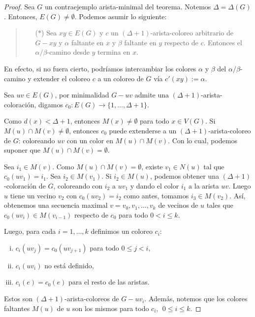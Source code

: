 \documentclass[12pt]{report}
\theoremstyle{plain}
\theoremstyle{definition}
\begin{document}
\begin{proof}
Sea $G$ un contraejemplo arista-minimal del teorema. Notemos $\Delta = \Delta (G)$. Entonces, $E(G) \neq \emptyset$. Podemos asumir lo siguiente:

\begin{quote}
\begin{enumerate}
\item[({$\ast$})]\label{vizing-proof-condition} Sea $xy \in E(G)$ y $c$ un $(\Delta + 1)$-arista-coloreo arbitrario de $G - xy$ y $\alpha$ faltante en $x$ y $\beta$ faltante en $y$ respecto de $c$. Entonces el $\alpha/\beta$-camino desde $y$ termina en $x$.
\end{enumerate}
\end{quote}
En efecto, si no fuera cierto, podríamos intercambiar los colores $\alpha$ y $\beta$ del $\alpha/\beta$-camino y extender el coloreo $c$ a un coloreo de $G$ vía $c'(xy):= \alpha$.

Sea $uv \in E(G)$, por minimalidad $G -uv$ admite una $(\Delta +1)$-arista-coloración, digamos $c_0: E(G) \rightarrow \{1, \ldots, \Delta + 1\}$.

\Inkscape{}

Como $d(x) < \Delta + 1$, entonces $M(x) \neq \emptyset$ para todo $x \in V(G)$. Si $M(u) \cap M(v) \neq \emptyset$, entonces $c_0$ puede extenderse a un $(\Delta + 1)$-arista-coloreo de $G$: coloreando $uv$ con un color en $M(u) \cap M(v)$. Con lo cual, podemos suponer que $M(u) \cap M(v) = \emptyset$.

Sea $i_1 \in M(v)$. Como $M(u) \cap M(v)  = \emptyset$, existe $v_1 \in N(u)$ tal que $c_0(uv_1) = i_1$. Sea $i_2 \in M(v_1)$. Si $i_2 \in M(u)$, podemos obtener una $(\Delta+1)$-coloración de $G$, coloreando con $i_2$ a $uv_1$ y dando el color $i_1$ a la arista $uv$. Luego $u$ tiene un vecino $v_2$ con $c_0(uv_2) = i_2$ como antes, tomamos $i_3 \in M(v_2)$. Así, obtenemos una secuencia maximal $v = v_0, v_1, \ldots, v_k$ de vecinos de $u$ tales que $c_0 (uv_i) \in M(v_{i-1})$ respecto de $c_0$ para todo $0 < i \leq k$.

Luego, para cada $i = 1, \ldots, k$ definimos un coloreo $c_i$:
\begin{enumerate}[(i)]
\item $c_i (uv_j) = c_0 (u v_{j+1})$ para todo $0 \leq j < i$,
\item $c_i (uv_i)$ no está definido,
\item $c_i (e) = c_0 (e)$ para el resto de las aristas.
\end{enumerate}
Estos son $(\Delta + 1)$-arista-coloreos de $G-uv_i$. Además, notemos que los colores faltantes $M(u)$ de $u$ son los mismos para todo $c_i, \: \: 0 \leq i \leq k$.


\end{proof}
\end{document}
